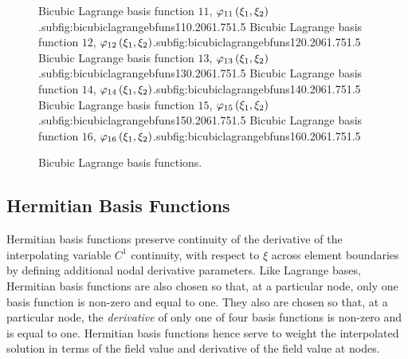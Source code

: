 \begin{figure}[hbtp]
     {Bicubic Lagrange basis function $11$, $   \varphi_{11} \left( \xi_{1},\xi_{2} \right)  $.}{subfig:bicubiclagrangebfuns11}{0.20\linewidth}{6}{1.75}{1.5}
   \hfil
     {Bicubic Lagrange basis function $12$, $   \varphi_{12} \left( \xi_{1},\xi_{2} \right)  $.}{subfig:bicubiclagrangebfuns12}{0.20\linewidth}{6}{1.75}{1.5}
     {Bicubic Lagrange basis function $13$, $   \varphi_{13} \left( \xi_{1},\xi_{2} \right)  $.}{subfig:bicubiclagrangebfuns13}{0.20\linewidth}{6}{1.75}{1.5}
   \hfil
     {Bicubic Lagrange basis function $14$, $   \varphi_{14} \left( \xi_{1},\xi_{2} \right)  $.}{subfig:bicubiclagrangebfuns14}{0.20\linewidth}{6}{1.75}{1.5}
   \hfil
     {Bicubic Lagrange basis function $15$, $   \varphi_{15} \left( \xi_{1},\xi_{2} \right)  $.}{subfig:bicubiclagrangebfuns15}{0.20\linewidth}{6}{1.75}{1.5}
   \hfil
     {Bicubic Lagrange basis function $16$, $   \varphi_{16} \left( \xi_{1},\xi_{2} \right)  $.}{subfig:bicubiclagrangebfuns16}{0.20\linewidth}{6}{1.75}{1.5}
   \caption[Bicubic Lagrange basis functions.]{Bicubic Lagrange basis functions.}
   \label{fig:bicubiclagrangebfuns}
\end{figure}

\subsection{Hermitian Basis Functions}
\label{sec:Hermitianbasisfunctions}

Hermitian basis functions preserve continuity of the derivative of the
interpolating variable \ie $C^{1}$ continuity, with respect to $\xi$ across
element boundaries by defining additional nodal derivative parameters. Like
Lagrange bases, Hermitian basis functions are also chosen so that, at a
particular node, only one basis function is non-zero and equal to one. They
also are chosen so that, at a particular node, the \emph{derivative} of only
one of four basis functions is non-zero and is equal to one. Hermitian basis
functions hence serve to weight the interpolated solution in terms of the
field value and derivative of the field value at nodes.

